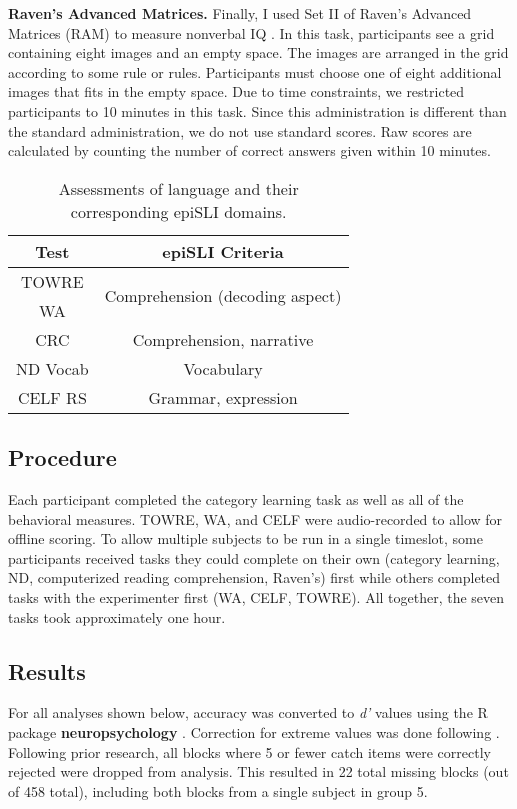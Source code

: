 \documentclass[../dissertation.tex]{subfiles}
\begin{document}
	\textbf{Raven's Advanced Matrices.} Finally, I used Set II of Raven's Advanced Matrices (RAM) to measure nonverbal IQ \citep{Raven1998}. In this task, participants see a grid containing eight images and an empty space. The images are arranged in the grid according to some rule or rules. Participants must choose one of eight additional images that fits in the empty space. Due to time constraints, we restricted participants to 10 minutes in this task. Since this administration is different than the standard administration, we do not use standard scores. Raw scores are calculated by counting the number of correct answers given within 10 minutes.

\begin{table}[H]
\caption{Assessments of language and their corresponding epiSLI domains.}
\vspace{-10pt}
\begin{center}
\begin{tabular}{ c|c } 
 \hline 
 Test & epiSLI Criteria \\ 
 \hline
 TOWRE & \multirow{2}{*}{Comprehension (decoding aspect)}\\ 
 WA & \\ 
 CRC & Comprehension, narrative \\
 ND Vocab & Vocabulary \\ 
 CELF RS & Grammar, expression \\ 
 \hline
\end{tabular}
\end{center}
\label{slitable}
\end{table}


\subsection{Procedure}
	Each participant completed the category learning task as well as all of the behavioral measures. TOWRE, WA, and CELF were audio-recorded to allow for offline scoring. To allow multiple subjects to be run in a single timeslot, some participants received tasks they could complete on their own (category learning, ND, computerized reading comprehension, Raven's) first while others completed tasks with the experimenter first (WA, CELF, TOWRE). All together, the seven tasks took approximately one hour.
	
\subsection{Results}
	For all analyses shown below, accuracy was converted to \textit{d'} values \citep{macmillan2004} using the R package \textbf{neuropsychology} \citep{neuropsych}. Correction for extreme values was done following \citep{Hautus1995}. Following prior research, all blocks where 5 or fewer catch items were correctly rejected were dropped from analysis. This resulted in 22 total missing blocks (out of 458 total), including both blocks from a single subject in group 5. \par
\end{document}
